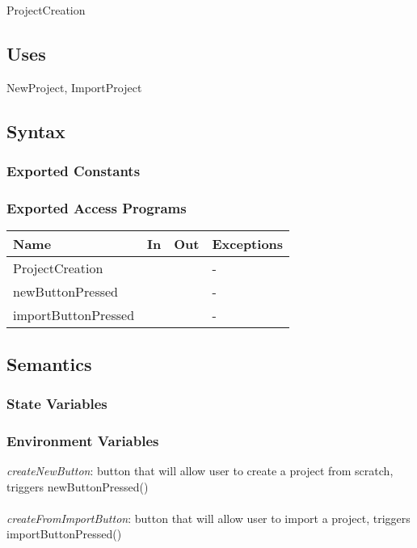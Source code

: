 \documentclass[12pt, titlepage]{article}
\begin{document}
	ProjectCreation
	
	\subsection{Uses}
	NewProject, ImportProject
	
	\subsection{Syntax}
	
	\subsubsection{Exported Constants}
	
	\subsubsection{Exported Access Programs}
	
	\begin{center}
		\begin{tabular}{p{2cm} p{4cm} p{4cm} p{2cm}}
			\hline
			\textbf{Name} & \textbf{In} & \textbf{Out} & \textbf{Exceptions} \\
			\hline
			ProjectCreation &  &  & - \\
			\hline
			newButtonPressed &  &  & - \\
			\hline
			importButtonPressed &  &  & - \\
			\hline
		\end{tabular}
	\end{center}
	
	\subsection{Semantics}
	
	\subsubsection{State Variables}
	
	\subsubsection{Environment Variables}
	
	\textit{createNewButton}: button that will allow user to create a project from scratch, triggers newButtonPressed() \\\\ 
	\textit{createFromImportButton}: button that will allow user to import a project, triggers importButtonPressed() \\\\
	
\end{document}
